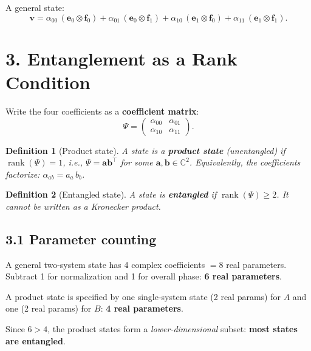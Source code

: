 \documentclass[12pt,a4paper]{article}
\newtheorem{definition}{Definition}
\begin{document}
A general state:
\[
    \mathbf{v} = \alpha_{00}\,(\mathbf{e}_0\otimes\mathbf{f}_0)
    + \alpha_{01}\,(\mathbf{e}_0\otimes\mathbf{f}_1)
    + \alpha_{10}\,(\mathbf{e}_1\otimes\mathbf{f}_0)
    + \alpha_{11}\,(\mathbf{e}_1\otimes\mathbf{f}_1).
\]

\section{3. Entanglement as a Rank Condition}

Write the four coefficients as a \textbf{coefficient matrix}:
\[
    \Psi = \begin{pmatrix}\alpha_{00} & \alpha_{01} \\ \alpha_{10} & \alpha_{11}\end{pmatrix}.
\]

\begin{definition}[Product state]
A state is a \textbf{product state} (unentangled) if $\operatorname{rank}(\Psi) = 1$, i.e., $\Psi = \mathbf{a}\mathbf{b}^\top$ for some $\mathbf{a}, \mathbf{b} \in \mathbb{C}^2$.  Equivalently, the coefficients factorize: $\alpha_{ab} = a_a\,b_b$.
\end{definition}

\begin{definition}[Entangled state]
A state is \textbf{entangled} if $\operatorname{rank}(\Psi) \geq 2$.  It cannot be written as a Kronecker product.
\end{definition}

\subsection{3.1 Parameter counting}
A general two-system state has 4 complex coefficients $= 8$ real parameters.  Subtract 1 for normalization and 1 for overall phase: \textbf{6 real parameters}.

A product state is specified by one single-system state (2 real params) for $A$ and one (2 real params) for $B$: \textbf{4 real parameters}.

Since $6>4$, the product states form a \emph{lower-dimensional} subset: \textbf{most states are entangled}.
\end{document}
